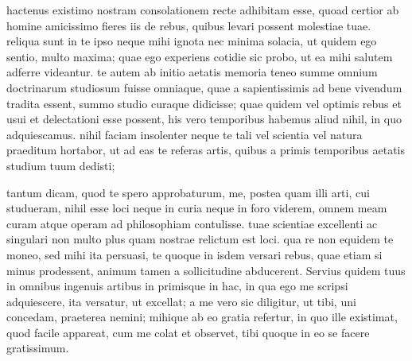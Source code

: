  hactenus existimo nostram consolationem recte adhibitam esse, quoad certior ab homine amicissimo fieres iis de rebus, quibus levari possent molestiae tuae. reliqua sunt in te ipso neque mihi ignota nec minima solacia, ut quidem ego sentio, multo maxima; quae ego experiens cotidie sic probo, ut ea mihi salutem adferre videantur. te autem ab initio aetatis memoria teneo summe omnium doctrinarum studiosum fuisse omniaque, quae a sapientissimis ad bene vivendum tradita essent, summo studio curaque didicisse; quae quidem vel optimis rebus et usui et delectationi esse possent, his vero temporibus habemus aliud nihil, in quo adquiescamus. nihil faciam insolenter neque te tali vel scientia vel natura praeditum hortabor, ut ad eas te referas artis, quibus a primis temporibus aetatis studium tuum dedisti;

 tantum dicam, quod te spero approbaturum, me, postea quam illi arti, cui studueram, nihil esse loci neque in curia neque in foro viderem, omnem meam curam atque operam ad philosophiam contulisse. tuae scientiae excellenti ac singulari non multo plus quam nostrae relictum est loci. qua re non equidem te moneo, sed mihi ita persuasi, te quoque in isdem versari rebus, quae etiam si minus prodessent, animum tamen a sollicitudine abducerent. Servius quidem tuus in omnibus ingenuis artibus in primisque in hac, in qua ego me scripsi adquiescere, ita versatur, ut excellat; a me vero sic diligitur, ut tibi, uni concedam, praeterea nemini; mihique ab eo gratia refertur, in quo ille existimat, quod facile appareat, cum me colat et observet, tibi quoque in eo se facere gratissimum.
